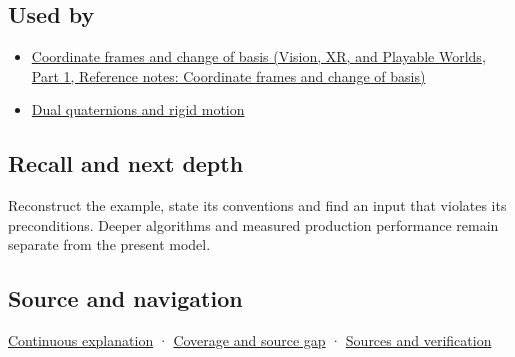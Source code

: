 \subsection{Used by}\label{appendix-0bf0ca73f735-used-by}

\hypertarget{appendix-0bf0ca73f735-used-by}{}

\begin{itemize}
\tightlist
\item
  \href{../07-Vision-XR-and-Playable-Worlds-P01/main.pdf\#nameddest=appendix-1bae9457dbc3}{Coordinate frames and change of basis (Vision, XR, and Playable Worlds, Part 1, Reference notes: Coordinate frames and change of basis)}
\item
  \hyperref[appendix-d1ea57347893]{Dual quaternions and rigid motion}
\end{itemize}

\subsection{Recall and next depth}\label{appendix-0bf0ca73f735-recall-and-next-depth}

\hypertarget{appendix-0bf0ca73f735-recall-and-next-depth}{}

Reconstruct the example, state its conventions and find an input that violates its preconditions. Deeper algorithms and measured production performance remain separate from the present model.

\subsection{Source and navigation}\label{appendix-0bf0ca73f735-source-and-navigation}

\hypertarget{appendix-0bf0ca73f735-source-and-navigation}{}

\hyperref[01-foundations-i-ch018-keep-the-promises-visible-while-moving-between-representations]{Continuous explanation} · \hyperref[appendix-fd090d982a15-phase-7---parts-601-700]{Coverage and source gap} · \hyperref[appendix-a103e7846d21-phase-7---source-analysis-and-verification]{Sources and verification}
